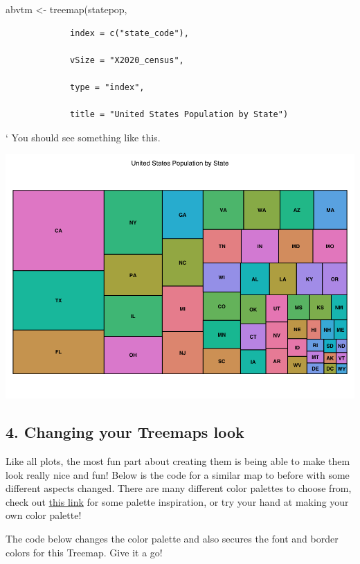 \documentclass[
]{article}
\begin{document}
abvtm \textless- treemap(statepop,

\begin{verbatim}
             index = c("state_code"),
             
             vSize = "X2020_census",
             
             type = "index",
             
             title = "United States Population by State")
\end{verbatim}

` You should see something like this.

\includegraphics{abrvtreemap.png}

\hypertarget{changing-your-treemaps-look-1}{%
\subsection{4. Changing your Treemaps
look}\label{changing-your-treemaps-look-1}}

Like all plots, the most fun part about creating them is being able to
make them look really nice and fun! Below is the code for a similar map
to before with some different aspects changed. There are many different
color palettes to choose from, check out
\href{https://www.datanovia.com/en/blog/the-a-z-of-rcolorbrewer-palette/\#:~:text=RColorBrewer\%20is\%20an\%20R\%20package,Install\%20and\%20load\%20RcolorBrewer\%20package}{this
link} for some palette inspiration, or try your hand at making your own
color palette!

The code below changes the color palette and also secures the font and
border colors for this Treemap. Give it a go!
\end{document}
